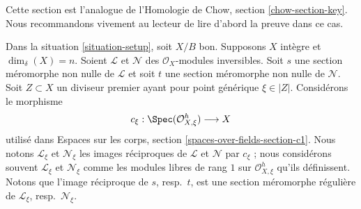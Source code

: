 \noindent
Cette section est l'analogue de l'Homologie de Chow, section
\ref{chow-section-key}. Nous recommandons vivement au lecteur de lire d'abord
la preuve dans ce cas.

\medskip\noindent
Dans la situation \ref{situation-setup}, soit $X/B$ bon. Supposons
$X$ intègre et $\dim_\delta(X) = n$. Soient $\mathcal{L}$ et
$\mathcal{N}$ des $\mathcal{O}_X$-modules inversibles. Soit $s$ une section
méromorphe non nulle de $\mathcal{L}$ et soit $t$ une section méromorphe non
nulle de $\mathcal{N}$. Soit $Z \subset X$ un diviseur premier ayant pour point
générique $\xi \in |Z|$. Considérons le morphisme
$$
c_\xi : \Spec(\mathcal{O}_{X, \xi}^h) \longrightarrow X
$$
utilisé dans Espaces sur les corps, section \ref{spaces-over-fields-section-c1}.
Nous notons $\mathcal{L}_\xi$ et $\mathcal{N}_\xi$ les images réciproques de
$\mathcal{L}$ et $\mathcal{N}$ par $c_\xi$ ; nous considérons souvent
$\mathcal{L}_\xi$ et $\mathcal{N}_\xi$ comme
les modules libres de rang $1$ sur $\mathcal{O}_{X, \xi}^h$ qu'ils définissent.
Notons que l'image réciproque de $s$, resp.\ $t$, est une section méromorphe régulière de $\mathcal{L}_\xi$,
resp.\ $\mathcal{N}_\xi$.

